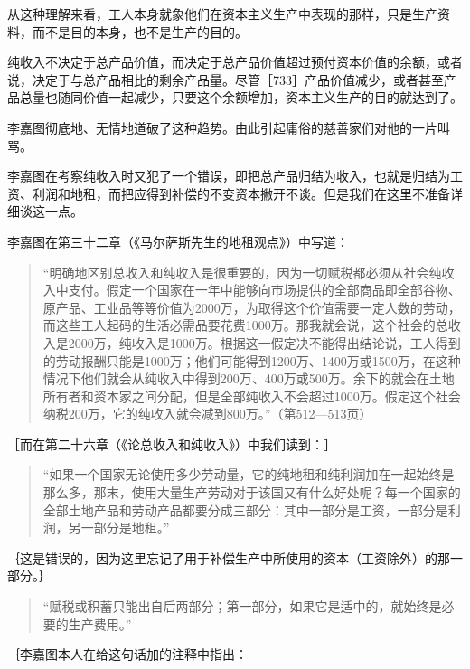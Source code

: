 从这种理解来看，工人本身就象他们在资本主义生产中表现的那样，只是生产资料，而不是目的本身，也不是生产的目的。

纯收入不决定于总产品价值，而决定于总产品价值超过预付资本价值的余额，或者说，决定于与总产品相比的剩余产品量。尽管［733］产品价值减少，或者甚至产品总量也随同价值一起减少，只要这个余额增加，资本主义生产的目的就达到了。

李嘉图彻底地、无情地道破了这种趋势。由此引起庸俗的慈善家们对他的一片叫骂。

李嘉图在考察纯收入时又犯了一个错误，即把总产品归结为收入，也就是归结为工资、利润和地租，而把应得到补偿的不变资本撇开不谈。但是我们在这里不准备详细谈这一点。

李嘉图在第三十二章（《马尔萨斯先生的地租观点》）中写道：

\begin{quote}{“明确地区别总收入和纯收入是很重要的，因为一切赋税都必须从社会纯收入中支付。假定一个国家在一年中能够向市场提供的全部商品即全部谷物、原产品、工业品等等价值为2000万，为取得这个价值需要一定人数的劳动，而这些工人起码的生活必需品要花费1000万。那我就会说，这个社会的总收入是2000万，纯收入是1000万。根据这一假定决不能得出结论说，工人得到的劳动报酬只能是1000万；他们可能得到1200万、1400万或1500万，在这种情况下他们就会从纯收入中得到200万、400万或500万。余下的就会在土地所有者和资本家之间分配，但是全部纯收入不会超过1000万。假定这个社会纳税200万，它的纯收入就会减到800万。”（第512—513页）}\end{quote}

［而在第二十六章（《论总收入和纯收入》）中我们读到：］

\begin{quote}{“如果一个国家无论使用多少劳动量，它的纯地租和纯利润加在一起始终是那么多，那末，使用大量生产劳动对于该国又有什么好处呢？每一个国家的全部土地产品和劳动产品都要分成三部分：其中一部分是工资，一部分是利润，另一部分是地租。”}\end{quote}

｛这是错误的，因为这里忘记了用于补偿生产中所使用的资本（工资除外）的那一部分。｝

\begin{quote}{“赋税或积蓄只能出自后两部分；第一部分，如果它是适中的，就始终是必要的生产费用。”}\end{quote}

｛李嘉图本人在给这句话加的注释中指出：

